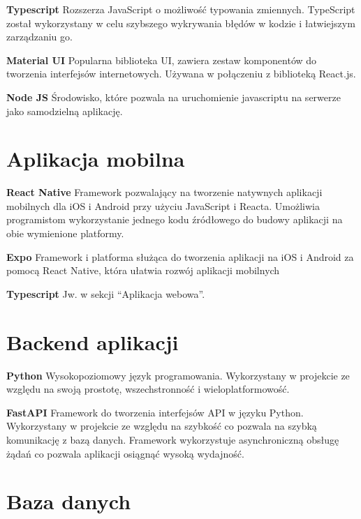 \medskip

\textbf{Typescript} Rozszerza JavaScript o możliwość typowania zmiennych. TypeScript został wykorzystany w celu szybszego wykrywania błędów w kodzie i łatwiejszym zarządzaniu go.

\medskip

\textbf{Material UI} Popularna biblioteka UI, zawiera zestaw komponentów do tworzenia interfejsów internetowych. Używana w połączeniu z biblioteką React.js.

\medskip

\textbf{Node JS} Środowisko, które pozwala na uruchomienie javascriptu na serwerze jako samodzielną aplikację.

\section{Aplikacja mobilna}

\textbf{React Native} Framework pozwalający na tworzenie natywnych aplikacji mobilnych dla iOS i Android przy użyciu JavaScript i Reacta. Umożliwia programistom wykorzystanie jednego kodu źródłowego do budowy aplikacji na obie wymienione platformy.

\medskip

\textbf{Expo} Framework i platforma służąca do tworzenia aplikacji na iOS i Android za pomocą React Native, która ułatwia rozwój aplikacji mobilnych

\medskip

\textbf{Typescript} Jw. w sekcji “Aplikacja webowa”.

\section{Backend aplikacji}

\textbf{Python} Wysokopoziomowy język programowania. Wykorzystany w projekcie ze względu na swoją prostotę, wszechstronność i wieloplatformowość.

\medskip

\textbf{FastAPI} Framework do tworzenia interfejsów API w języku Python. Wykorzystany w projekcie ze względu na szybkość co pozwala na szybką komunikację z bazą danych. Framework wykorzystuje asynchroniczną obsługę żądań co pozwala aplikacji osiągnąć wysoką wydajność.

\section{Baza danych}

